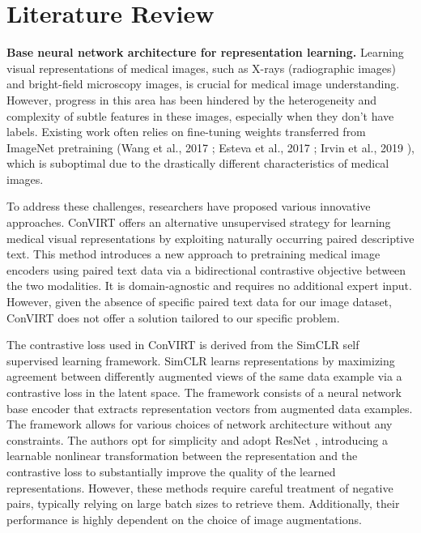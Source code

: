 \chapter{Literature Review}\label{ch:Literature Review}

\textbf{Base neural network architecture for representation learning.} Learning visual representations of medical images, such as X-rays (radiographic images) and bright-field microscopy images, is crucial for medical image understanding. However, progress in this area has been hindered by the heterogeneity and complexity of subtle features in these images, especially when they don't have labels. Existing work often relies on fine-tuning weights transferred from ImageNet pretraining (Wang et al., 2017 \cite{8099852} ; Esteva et al., 2017 \cite{Esteva2017Dermatologist} ; Irvin et al., 2019 \cite{irvin2019chexpert} ), which is suboptimal due to the drastically different characteristics of medical images. 

To address these challenges, researchers have proposed various innovative approaches. ConVIRT \cite{zhang2022contrastive} offers an alternative unsupervised strategy for learning medical visual representations by exploiting naturally occurring paired descriptive text. This method introduces a new approach to pretraining medical image encoders using paired text data via a bidirectional contrastive objective between the two modalities. It is domain-agnostic and requires no additional expert input.  However, given the absence of specific paired text data for our image dataset, ConVIRT does not offer a solution tailored to our specific problem.

The contrastive loss used in ConVIRT is derived from the SimCLR \cite{chen2020simple} self supervised learning framework. SimCLR learns representations by maximizing agreement between differently augmented views of the same data example via a contrastive loss in the latent space. The framework consists of a neural network base encoder that extracts representation vectors from augmented data examples. The framework allows for various choices of network architecture without any constraints. The authors opt for simplicity and adopt ResNet \cite{he2015deepresiduallearningimage}, introducing a learnable nonlinear transformation between the representation and the contrastive loss to substantially improve the quality of the learned representations. However, these methods require careful treatment of negative pairs, typically relying on large batch sizes to retrieve them. Additionally, their performance is highly dependent on the choice of image augmentations. 

